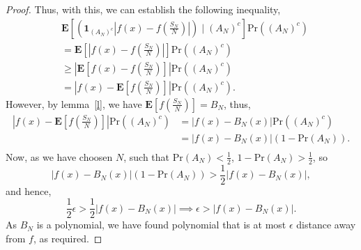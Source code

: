 \documentclass[
]{article}
\begin{document}
\begin{proof}
Thus, with this, we can establish the following inequality,
\begin{align*}
& \mathbf{E}\left[ \left(\mathbf{1}_{(A_N)^c} \left| f(x) - f \left(\frac{S_N}{N}\right) \right| \right) \mid (A_N)^c \right] \text{Pr}((A_N)^c) \\
& = \mathbf{E}\left[ \left| f(x) - f \left(\frac{S_N}{N}\right) \right|\right] \text{Pr}((A_N)^c) \\
& \ge \left| \mathbf{E}\left[f(x) - f \left(\frac{S_N}{N}\right) \right] \right| \text{Pr}((A_N)^c) \\
& = \left| f(x) - \mathbf{E}\left[f \left(\frac{S_N}{N}\right) \right] \right| \text{Pr}((A_N)^c).
\end{align*}
However, by lemma~\ref{l}, we have $\mathbf{E}\left[f \left(\frac{S_N}{N}\right) \right] = B_N$, thus, 
\begin{align*}
\left| f(x) - \mathbf{E}\left[f \left(\frac{S_N}{N}\right) \right] \right| \text{Pr}((A_N)^c) & = \left| f(x) - B_N(x) \right| \text{Pr}((A_N)^c)\\
& = \left| f(x) - B_N(x) \right| (1 - \text{Pr}(A_N)). \\
\end{align*}
Now, as we have choosen $N$, such that $\text{Pr}(A_N) < \frac{1}{2}$, $1 - \text{Pr}(A_N) > \frac{1}{2}$, so 
$$ \left| f(x) - B_N(x) \right| (1 - \text{Pr}(A_N)) > \frac{1}{2}\left| f(x) - B_N(x) \right|,$$
and hence, 
$$
\frac{1}{2} \epsilon > \frac{1}{2}\left| f(x) - B_N(x) \right| 
\implies \epsilon > \left| f(x) - B_N(x) \right|.
$$
As $B_N$ is a polynomial, we have found polynomial that is at most $\epsilon$ distance away from $f$, as required.
\end{proof}
\end{document}
